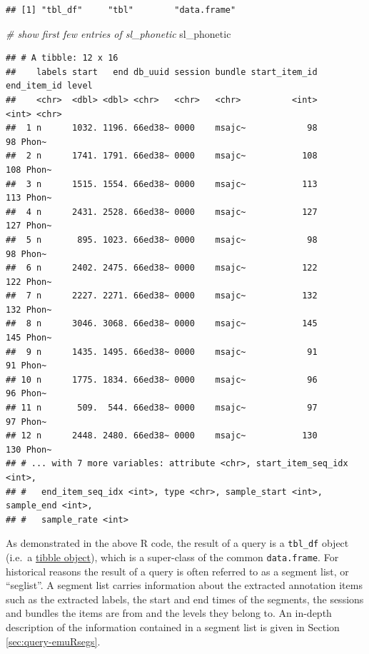 \documentclass[]{book}
\newenvironment{Shaded}{\begin{snugshade}}{\end{snugshade}}
\newcommand{\CommentTok}[1]{\textcolor[rgb]{0.56,0.35,0.01}{\textit{#1}}}
\newcommand{\NormalTok}[1]{#1}
\begin{document}
\begin{verbatim}
## [1] "tbl_df"     "tbl"        "data.frame"
\end{verbatim}

\begin{Shaded}
\begin{Highlighting}[]
\CommentTok{# show first few entries of sl_phonetic}
\NormalTok{sl_phonetic}
\end{Highlighting}
\end{Shaded}

\begin{verbatim}
## # A tibble: 12 x 16
##    labels start   end db_uuid session bundle start_item_id end_item_id level
##    <chr>  <dbl> <dbl> <chr>   <chr>   <chr>          <int>       <int> <chr>
##  1 n      1032. 1196. 66ed38~ 0000    msajc~            98          98 Phon~
##  2 n      1741. 1791. 66ed38~ 0000    msajc~           108         108 Phon~
##  3 n      1515. 1554. 66ed38~ 0000    msajc~           113         113 Phon~
##  4 n      2431. 2528. 66ed38~ 0000    msajc~           127         127 Phon~
##  5 n       895. 1023. 66ed38~ 0000    msajc~            98          98 Phon~
##  6 n      2402. 2475. 66ed38~ 0000    msajc~           122         122 Phon~
##  7 n      2227. 2271. 66ed38~ 0000    msajc~           132         132 Phon~
##  8 n      3046. 3068. 66ed38~ 0000    msajc~           145         145 Phon~
##  9 n      1435. 1495. 66ed38~ 0000    msajc~            91          91 Phon~
## 10 n      1775. 1834. 66ed38~ 0000    msajc~            96          96 Phon~
## 11 n       509.  544. 66ed38~ 0000    msajc~            97          97 Phon~
## 12 n      2448. 2480. 66ed38~ 0000    msajc~           130         130 Phon~
## # ... with 7 more variables: attribute <chr>, start_item_seq_idx <int>,
## #   end_item_seq_idx <int>, type <chr>, sample_start <int>, sample_end <int>,
## #   sample_rate <int>
\end{verbatim}

As demonstrated in the above R code, the result of a query is a \texttt{tbl\_df} object (i.e.~a \href{https://tibble.tidyverse.org/index.html}{tibble object}), which is a super-class of the common \texttt{data.frame}. For historical reasons the result of a query is often referred to as a segment list, or ``seglist''. A segment list carries information about the extracted annotation items such as the extracted labels, the start and end times of the segments, the sessions and bundles the items are from and the levels they belong to. An in-depth description of the information contained in a segment list is given in Section \ref{sec:query-emuRsegs}.
\end{document}
